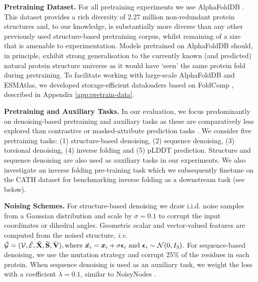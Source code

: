 \textbf{Pretraining Dataset. } For all pretraining experiments we use AlphaFoldDB \citep{BarrioHernandez2023}. 
This dataset provides a rich diversity of 2.27 million non-redundant protein structures and, to our knowledge, is substantially more diverse than any other previously used structure-based pretraining corpus, whilst remaining of a size that is amenable to experimentation.
Models pretrained on AlphaFoldDB should, in principle, exhibit strong generalisation to the currently known (and predicted) natural protein structure universe as it would have `seen'
 the same protein fold during pretraining.
To facilitate working with large-scale AlphaFoldDB and ESMAtlas, we developed storage-efficient dataloaders based on FoldComp \citet{Kim2023}, described in Appendix \ref{app:pretrain-data}.

\textbf{Pretraining and Auxiliary Tasks. } In our evaluation, we focus predominantly on denoising-based pretraining and auxiliary tasks as these are comparatively less explored than contrastive or masked-attribute prediction tasks \citep{zhang2023protein}. We consider five pretraining tasks: (1) structure-based denoising, (2) sequence denoising, (3) torsional denoising, (4) inverse folding and (5) pLDDT prediction. Structure and sequence denoising are also used as auxiliary tasks in our experiments.
We also investigate an inverse folding pre-training task which we subsequently finetune on the CATH dataset for benchmarking inverse folding as a downstream task (see below).

\textbf{Noising Schemes. } For structure-based denoising we draw i.i.d. noise samples from a Gaussian distribution and scale by $\sigma=0.1$ to corrupt the input coordinates or dihedral angles. Geometric scalar and vector-valued features are computed from the noised structure, \textit{i.e.}
$\tilde{\mathcal{G}} = (\mathcal{V}, \tilde{\mathcal{E}}, \tilde{\mathbf{X}}, \tilde{\mathbf{S}}, \tilde{\mathbf{V}}), \mathrm{ where }\ \tilde{\vx_{i}} = \vx_{i} + \sigma \bm{\epsilon}_{i}\ \mathrm{ and }\ \bm{\epsilon}_{i} \sim \mathcal{N}(0, I_3).
$
For sequence-based denoising, we use the mutation strategy and corrupt 25\% of the residues in each protein. When sequence denoising is used as an auxiliary task, we weight the loss with a coefficient $\lambda = 0.1$, similar to NoisyNodes \citep{godwin2021simple}. 



